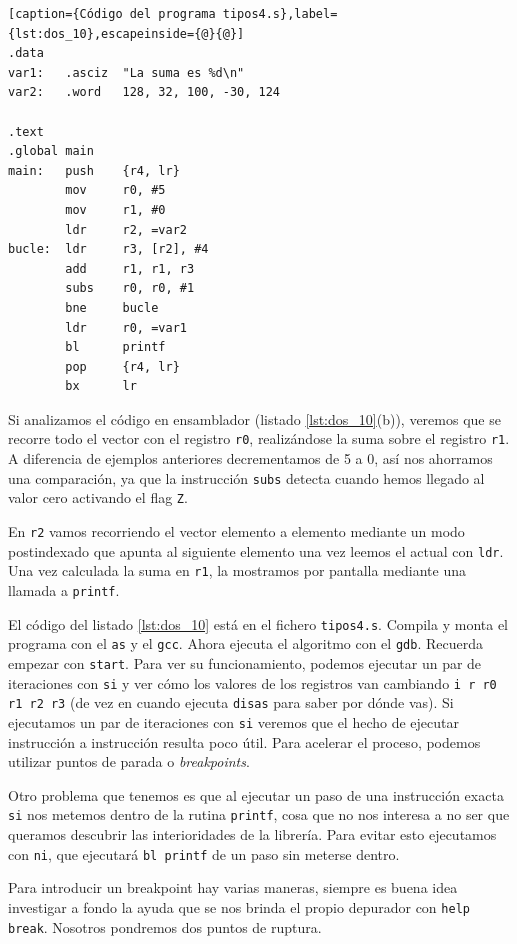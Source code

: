 \begin{lstlisting}[caption={Código del programa tipos4.s},label={lst:dos_10},escapeinside={@}{@}]
.data
var1:   .asciz  "La suma es %d\n"
var2:   .word   128, 32, 100, -30, 124

.text
.global main
main:   push    {r4, lr}
        mov     r0, #5
        mov     r1, #0
        ldr     r2, =var2
bucle:  ldr     r3, [r2], #4
        add     r1, r1, r3
        subs    r0, r0, #1
        bne     bucle
        ldr     r0, =var1
        bl      printf
        pop     {r4, lr}
        bx      lr
\end{lstlisting}

Si analizamos el código en ensamblador (listado \ref{lst:dos_10}(b)), veremos que se
recorre todo el vector con el registro {\tt r0}, realizándose la suma sobre el
registro {\tt r1}. A diferencia de ejemplos anteriores decrementamos de 5 a 0, así
nos ahorramos una comparación, ya que la instrucción {\tt subs} detecta cuando hemos
llegado al valor cero activando el flag {\tt Z}.

En {\tt r2} vamos recorriendo el vector elemento a elemento mediante un modo postindexado
que apunta al siguiente elemento una vez leemos el actual con {\tt ldr}. Una vez calculada
la suma en {\tt r1}, la mostramos por pantalla mediante una llamada a {\tt printf}.

El código del listado \ref{lst:dos_10} está en el fichero {\tt tipos4.s}. Compila y
monta el programa con el {\tt as} y el {\tt gcc}. Ahora ejecuta el algoritmo
con el {\tt gdb}. Recuerda empezar con {\tt start}. Para ver su funcionamiento,
podemos ejecutar un par de iteraciones con {\tt si} y ver cómo los valores de
los registros van cambiando {\tt i r r0 r1 r2 r3} (de vez en cuando ejecuta
{\tt disas} para saber por dónde vas). Si ejecutamos un par de iteraciones con
{\tt si} veremos que el hecho de ejecutar instrucción a instrucción resulta
poco útil. Para acelerar el proceso, podemos utilizar puntos de parada o {\it breakpoints}.

Otro problema que tenemos es que al ejecutar un paso de una instrucción exacta {\tt si}
nos metemos dentro de la rutina {\tt printf}, cosa que no nos interesa a no ser que queramos
descubrir las interioridades de la librería. Para evitar esto ejecutamos con {\tt ni}, que
ejecutará {\tt bl printf} de un paso sin meterse dentro.

Para introducir un breakpoint hay varias maneras, siempre es buena idea investigar a fondo
la ayuda que se nos brinda el propio depurador con {\tt help break}. Nosotros pondremos dos
puntos de ruptura.

